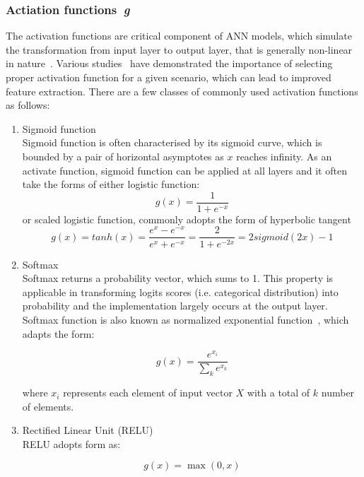 \subsubsection{Actiation functions~\textit{g}}
The activation functions are critical component of ANN models, which simulate the transformation from input layer to output layer, that is generally non-linear in nature~\cite{LeCun_2015}. Various studies~\cite{Bengio_2012,Singh_2013} have demonstrated the importance of selecting proper activation function for a given scenario, which can lead to improved feature extraction. There are a few classes of commonly used activation functions as follows:
\begin{enumerate}
\item Sigmoid function \\
Sigmoid function is often characterised by its sigmoid curve, which is bounded by a pair of horizontal asymptotes as $x$ reaches infinity. As an activate function, sigmoid function can be applied at all layers and it often take the forms of either logistic function:
\begin{equation}
    g(x) = \frac{1} {1+ e^{-x}}
\end{equation}
or scaled logistic function, commonly adopts the form of hyperbolic tangent
\begin{equation}
    g(x) = tanh(x) = \frac{e^x-e^{-x}} {e^x + e^{-x}} = \frac {2} {1 + e^{-2x}} = 2 sigmoid(2x) - 1
\end{equation}

\item Softmax \\
Softmax returns a probability vector, which sums to 1. This property is applicable in transforming logits scores (i.e.  categorical distribution) into probability and the implementation largely occurs at the output layer. Softmax function is also known as normalized exponential function~\cite{Howard_2007}, which adapts the form: 

\begin{equation}
    g(x) = \frac{e^{x_i}} {\sum_k e^{x_k}}
\end{equation}

where $x_i$ represents each element of input vector $X$ with a total of $k$ number of elements. 

\item Rectified Linear Unit (RELU) \\
RELU adopts form as:

\begin{equation}
    g(x) = \max(0,x)
\end{equation}


\end{enumerate}

